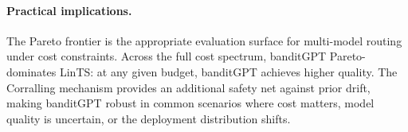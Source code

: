 \paragraph{Practical implications.}
The Pareto frontier is the appropriate evaluation surface for multi-model routing under cost constraints. Across the full cost spectrum, banditGPT Pareto-dominates LinTS: at any given budget, banditGPT achieves higher quality. The Corralling mechanism provides an additional safety net against prior drift, making banditGPT robust in common scenarios where cost matters, model quality is uncertain, or the deployment distribution shifts.
